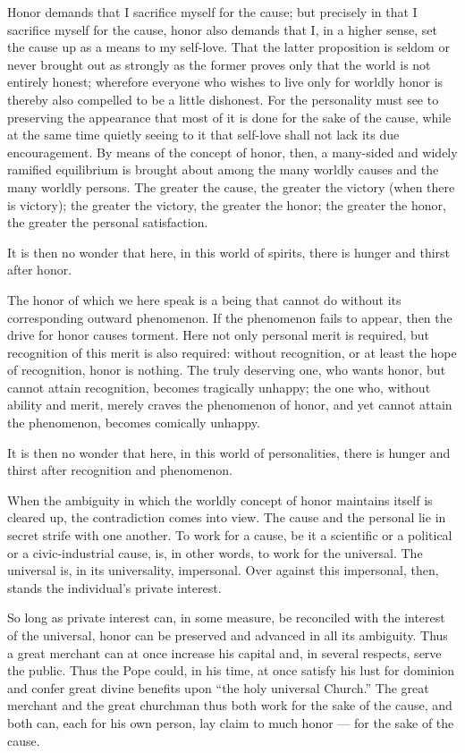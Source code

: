 \documentclass[12pt,a4paper]{book}
\begin{document}
Honor demands that I sacrifice myself for the cause; but precisely in that I sacrifice myself for the cause, honor also demands that I, in a higher sense, set the cause up as a means to my self-love. That the latter proposition is seldom or never brought out as strongly as the former proves only that the world is not entirely honest; wherefore everyone who wishes to live only for worldly honor is thereby also compelled to be a little dishonest. For the personality must see to preserving the appearance that most of it is done for the sake of the cause, while at the same time quietly seeing to it that self-love shall not lack its due encouragement. By means of the concept of honor, then, a many-sided and widely ramified equilibrium is brought about among the many worldly causes and the many worldly persons. The greater the cause, the greater the victory (when there is victory); the greater the victory, the greater the honor; the greater the honor, the greater the personal satisfaction.

It is then no wonder that here, in this world of spirits, there is hunger and thirst after honor.

The honor of which we here speak is a being that cannot do without its corresponding outward phenomenon. If the phenomenon fails to appear, then the drive for honor causes torment. Here not only personal merit is required, but recognition of this merit is also required: without recognition, or at least the hope of recognition, honor is nothing. The truly deserving one, who wants honor, but cannot attain recognition, becomes tragically unhappy; the one who, without ability and merit, merely craves the phenomenon of honor, and yet cannot attain the phenomenon, becomes comically unhappy.

It is then no wonder that here, in this world of personalities, there is hunger and thirst after recognition and phenomenon.

When the ambiguity in which the worldly concept of honor maintains itself is cleared up, the contradiction comes into view. The cause and the personal lie in secret strife with one another. To
work for a cause, be it a scientific or a political or a civic-industrial cause, is, in other words, to work for the universal. The universal is, in its universality, impersonal. Over against this impersonal, then, stands the individual's private interest.

So long as private interest can, in some measure, be reconciled with the interest of the universal, honor can be preserved and advanced in all its ambiguity. Thus a great merchant can at once increase his capital and, in several respects, serve the public. Thus the Pope could, in his time, at once satisfy his lust for dominion and confer great divine benefits upon ``the holy universal Church.'' The great merchant and the great churchman thus both work for the sake of the cause, and both can, each for his own person, lay claim to much honor --- for the sake of the cause.
\end{document}
